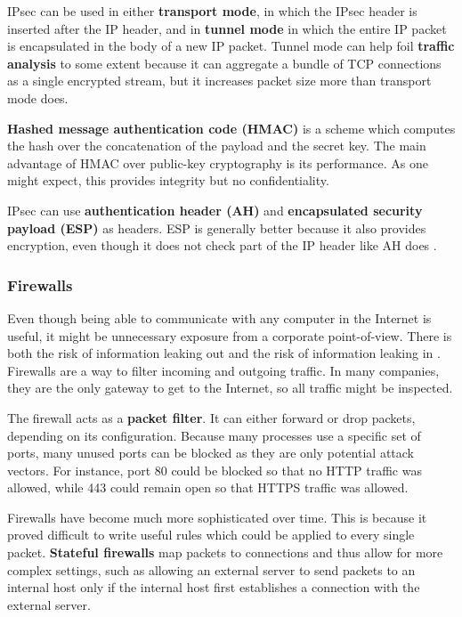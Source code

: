 IPsec can be used in either \textbf{transport mode}, in which the IPsec header is inserted after the IP header, and in \textbf{tunnel mode} in which the entire IP packet is encapsulated in the body of a new IP packet.
Tunnel mode can help foil \textbf{traffic analysis} to some extent because it can aggregate a bundle of TCP connections as a single encrypted stream, but it increases packet size more than transport mode does.

\textbf{Hashed message authentication code (HMAC)} is a scheme which computes the hash over the concatenation of the payload and the secret key.
The main advantage of HMAC over public-key cryptography is its performance. As one might expect, this provides integrity but no confidentiality.

IPsec can use \textbf{authentication header (AH)} and \textbf{encapsulated security payload (ESP)} as headers.
ESP is generally better because it also provides encryption, even though it does not check part of the IP header like AH does \cite[p.~818]{computer-networks-tanenbaum-2012}.

\subsubsection{Firewalls}

Even though being able to communicate with any computer in the Internet is useful, it might be unnecessary exposure from a corporate point-of-view.
There is both the risk of information leaking out and the risk of information leaking in \cite[p.~818]{computer-networks-tanenbaum-2012}.
Firewalls are a way to filter incoming and outgoing traffic. In many companies, they are the only gateway to get to the Internet, so all traffic might be inspected.

The firewall acts as a \textbf{packet filter}. It can either forward or drop packets, depending on its configuration.
Because many processes use a specific set of ports, many unused ports can be blocked as they are only potential attack vectors.
For instance, port 80 could be blocked so that no HTTP traffic was allowed, while 443 could remain open so that HTTPS traffic was allowed.

Firewalls have become much more sophisticated over time. This is because it proved difficult to write useful rules which could be applied to every single packet.
\textbf{Stateful firewalls} map packets to connections and thus allow for more complex settings, such as allowing an external server to send packets to an internal host only if the internal host first establishes a connection with the external server.

